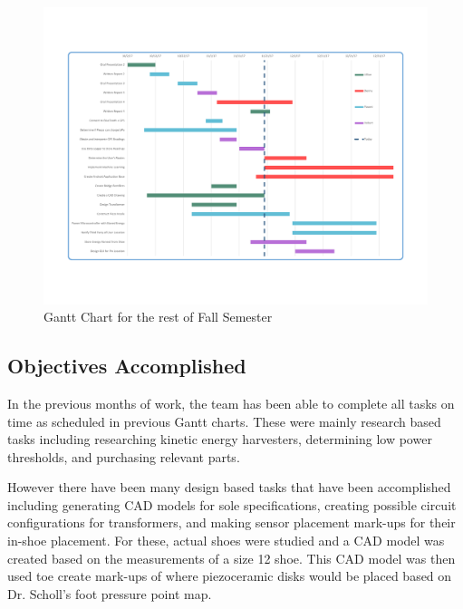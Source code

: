 \documentclass[letterpaper, 12 pt, onecolumn, hidelinks]{ieeetran}
\begin{document}
\begin{figure}[h]
	\begin{center}
		\includegraphics[trim=55 100 75 95, clip, width=\columnwidth]{GanttChart.pdf}
	\end{center}
	\vspace{-1em}
	\caption{\label{fig:Gantt}Gantt Chart for the rest of Fall Semester}
\end{figure}

\subsection{Objectives Accomplished}\label{sec:Accomplished}
In the previous months of work, the team has been able to complete all tasks on time as scheduled in previous Gantt charts. These were mainly research based tasks including researching kinetic energy harvesters, determining low power thresholds, and purchasing relevant parts. 

However there have been many design based tasks that have been accomplished including generating CAD models for sole specifications, creating possible circuit configurations for transformers, and making sensor placement mark-ups for their in-shoe placement. For these, actual shoes were studied and a CAD model was created based on the measurements of a size 12 shoe. This CAD model was then used toe create mark-ups of where piezoceramic disks would be placed based on Dr. Scholl's foot pressure point map.
\end{document}
